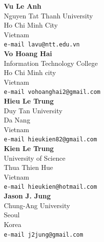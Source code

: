 \documentclass[10pt,leqno,twoside]{article}
\begin{document}
\noindent\textbf{Vu Le Anh}\\
Nguyen Tat Thanh University\\
Ho Chi Minh City\\
Vietnam\\
{\tt e-mail lavu@ntt.edu.vn}\\

\noindent\textbf{Vo Hoang Hai}\\
Information Technology College\\
Ho Chi Minh city\\
Vietnam\\
{\tt e-mail vohoanghai2@gmail.com}\\

\noindent\textbf{Hieu Le Trung}\\
Duy Tan University\\
Da Nang\\
Vietnam\\
{\tt e-mail hieukien82@gmail.com}\\

\noindent\textbf{Kien Le Trung}\\
University of Science\\
Thua Thien Hue\\
Vietnam\\
{\tt e-mail hieukien@hotmail.com}\\

\noindent\textbf{Jason J. Jung}\\
Chung-Ang University\\
Seoul\\
Korea\\
{\tt e-mail j2jung@gmail.com }
\end{document}
